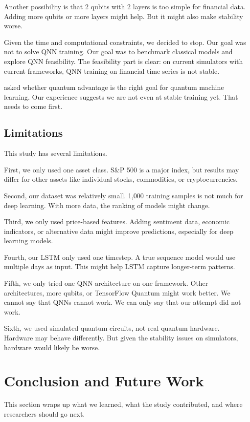\documentclass[12pt,a4paper]{article}
\begin{document}
Another possibility is that 2 qubits with 2 layers is too simple for financial data. Adding more qubits or more layers might help. But it might also make stability worse.

Given the time and computational constraints, we decided to stop. Our goal was not to solve QNN training. Our goal was to benchmark classical models and explore QNN feasibility. The feasibility part is clear: on current simulators with current frameworks, QNN training on financial time series is not stable.

\citet{schuld2022} asked whether quantum advantage is the right goal for quantum machine learning. Our experience suggests we are not even at stable training yet. That needs to come first.

\subsection{Limitations}
This study has several limitations.

First, we only used one asset class. S\&P 500 is a major index, but results may differ for other assets like individual stocks, commodities, or cryptocurrencies.

Second, our dataset was relatively small. 1,000 training samples is not much for deep learning. With more data, the ranking of models might change.

Third, we only used price-based features. Adding sentiment data, economic indicators, or alternative data might improve predictions, especially for deep learning models.

Fourth, our LSTM only used one timestep. A true sequence model would use multiple days as input. This might help LSTM capture longer-term patterns.

Fifth, we only tried one QNN architecture on one framework. Other architectures, more qubits, or TensorFlow Quantum might work better. We cannot say that QNNs cannot work. We can only say that our attempt did not work.

Sixth, we used simulated quantum circuits, not real quantum hardware. Hardware may behave differently. But given the stability issues on simulators, hardware would likely be worse.

\section{Conclusion and Future Work}
This section wraps up what we learned, what the study contributed, and where researchers should go next.
\end{document}
